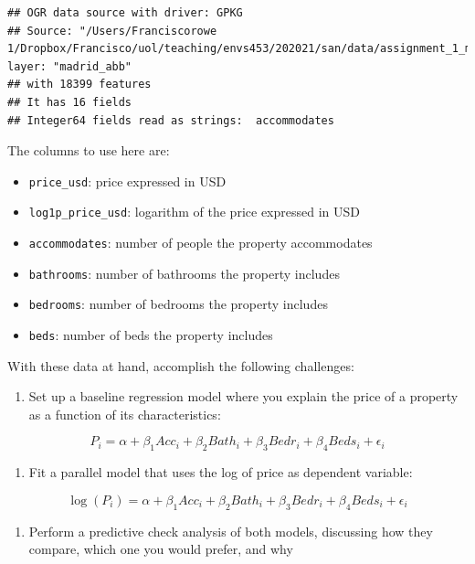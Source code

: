 \documentclass[
]{book}
\providecommand{\tightlist}{%
  \setlength{\itemsep}{0pt}\setlength{\parskip}{0pt}}
\begin{document}
\begin{verbatim}
## OGR data source with driver: GPKG 
## Source: "/Users/Franciscorowe 1/Dropbox/Francisco/uol/teaching/envs453/202021/san/data/assignment_1_madrid/madrid_abb.gpkg", layer: "madrid_abb"
## with 18399 features
## It has 16 fields
## Integer64 fields read as strings:  accommodates
\end{verbatim}

The columns to use here are:

\begin{itemize}
\tightlist
\item
  \texttt{price\_usd}: price expressed in USD
\item
  \texttt{log1p\_price\_usd}: logarithm of the price expressed in USD
\item
  \texttt{accommodates}: number of people the property accommodates
\item
  \texttt{bathrooms}: number of bathrooms the property includes
\item
  \texttt{bedrooms}: number of bedrooms the property includes
\item
  \texttt{beds}: number of beds the property includes
\end{itemize}

With these data at hand, accomplish the following challenges:

\begin{enumerate}
\def\labelenumi{\arabic{enumi}.}
\tightlist
\item
  Set up a baseline regression model where you explain the price of a property as a function of its characteristics:
\end{enumerate}

\[
P_i = \alpha + \beta_1 Acc_i + \beta_2 Bath_i + \beta_3 Bedr_i + \beta_4 Beds_i + \epsilon_i
\]

\begin{enumerate}
\def\labelenumi{\arabic{enumi}.}
\setcounter{enumi}{1}
\tightlist
\item
  Fit a parallel model that uses the log of price as dependent variable:
\end{enumerate}

\[
\log(P_i) = \alpha + \beta_1 Acc_i + \beta_2 Bath_i + \beta_3 Bedr_i + \beta_4 Beds_i + \epsilon_i
\]

\begin{enumerate}
\def\labelenumi{\arabic{enumi}.}
\setcounter{enumi}{2}
\tightlist
\item
  Perform a predictive check analysis of both models, discussing how they compare, which one you would prefer, and why
\end{enumerate}
\end{document}
